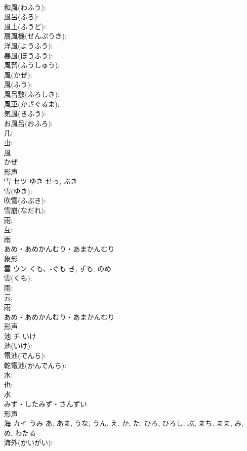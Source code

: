 \documentclass[8pt]{extreport}
\begin{document}
\begin{CJK}{UTF8}{min}
\\	和風(わふう): 
\\	風呂(ふろ): 
\\	風土(ふうど): 
\\	扇風機(せんぷうき): 
\\	洋風(ようふう): 
\\	暴風(ぼうふう): 
\\	風習(ふうしゅう): 
\\	風(かぜ): 
\\	風(ふう): 
\\	風呂敷(ふろしき): 
\\	風車(かざぐるま): 
\\	気風(きふう): 
\\	お風呂(おふろ): 
\\	几: 
\\	虫: 
\\	風	
\\	かぜ	
\\	形声 
\\	雪	セツ	ゆき	せっ, ぶき	
\\	雪(ゆき): 
\\	吹雪(ふぶき): 
\\	雪崩(なだれ): 
\\	雨: 
\\	彑: 
\\	雨	
\\	あめ・あめかんむり・あまかんむり	
\\	象形 
\\	雲	ウン	くも、-ぐも	き, ずも, のめ	
\\	雲(くも): 
\\	雨: 
\\	云: 
\\	雨	
\\	あめ・あめかんむり・あまかんむり	
\\	形声 
\\	池	チ	いけ		
\\	池(いけ): 
\\	電池(でんち): 
\\	乾電池(かんでんち): 
\\	水: 
\\	也: 
\\	水	
\\	みず・したみず・さんずい	
\\	形声 
\\	海	カイ	うみ	あ, あま, うな, うん, え, か, た, ひろ, ひろし, ぶ, まち, まま, み, め, わたる	
\\	海外(かいがい): 

\end{CJK}
\end{document}
